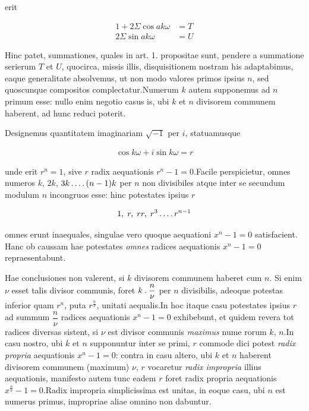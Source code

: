 erit

\[
\begin{aligned}
1+2\Sigma\cos ak\omega&=T\\
2\Sigma\sin ak\omega&=U
\end{aligned}
\]

Hinc patet, summationes, quales in art. 1. propositae sunt, pendere a summatione serierum $T$ et $U$, quocirca, missis illis, disquisitionem nostram his adaptabimus, eaque generalitate absolvemus, ut non modo valores primos ipsius $n$, sed quoscunque compositos complectatur.\quad Numerum $k$ autem supponemus ad $n$ primum esse: nullo enim negotio casus is, ubi $k$ et $n$ divisorem communem haberent, ad hunc reduci poterit.


Designemus quantitatem imaginariam $\surd{-1}$ per $i$, statuamusque

\[
\begin{aligned}
\cos k\omega+i\sin k\omega=r
\end{aligned}
\]

unde erit $r^n=1$, sive $r$ radix aequationis $r^n-1=0$.\quad Facile perspicietur, omnes numeros $k$, $2k$, $3k\mathinner{.\,.\,.\,.}(n-1)k$ per $n$ non divisibiles atque inter se secundum modulum $n$ incongruos esse: hinc potestates ipsius $r$

\[
\begin{aligned}
1,\;r,\;rr,\;r^3\mathinner{.\,.\,.\,.} r^{n-1}
\end{aligned}
\]

omnes erunt inaequales, singulae vero quoque aequationi $x^n-1=0$ satisfacient. Hanc ob caussam hae potestates \emph{omnes} radices aequationis $x^n-1=0$ repraesentabunt.

Hae conclusiones non valerent, si $k$ divisorem communem haberet cum $n$. Si enim $\nu$ esset talis divisor communis, foret $k\mathbin{.}\dfrac n\nu$ per $n$ divisibilis, adeoque potestas inferior quam $r^n$, puta $r^{\frac n\nu}$, unitati aequalis.\quad In hoc itaque casu potestates ipsius $r$ ad summum $\dfrac n\nu$ radices aequationis $x^n-1=0$ exhibebunt, et quidem revera tot radices diversas sistent, si $\nu$ est divisor communis \emph{maximus} nume%
rorum $k$, $n$.\quad In casu nostro, ubi $k$ et $n$ supponuntur inter se primi, $r$ commode dici potest \emph{radix propria} aequationis $x^n-1=0$: contra in casu altero, ubi $k$ et $n$ haberent divisorem communem (maximum) $\nu$, $r$ vocaretur \emph{radix impropria} illius aequationis, manifesto autem tunc eadem $r$ foret radix propria aequationis $x^{\frac n\nu}-1=0$.\quad Radix impropria simplicissima est unitas, in eoque casu, ubi $n$ est numerus primus, impropriae aliae omnino non dabuntur.

